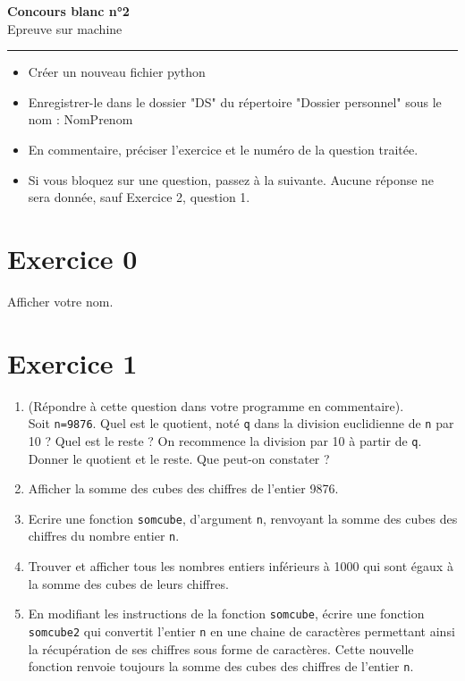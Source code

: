 \documentclass[a4paper,10pt]{article}
\begin{document}

\begin{center}
\Large \textbf{Concours blanc n°2} \\
Epreuve sur machine \\
\rule{16.5cm}{0.05cm}
\end{center}

\begin{boxedminipage}{\textwidth} 
\begin{itemize}
\item Créer un nouveau fichier python
\item Enregistrer-le dans le dossier "DS" du répertoire "Dossier personnel" sous le nom : NomPrenom
\item En commentaire, préciser l'exercice et le numéro de la question traitée.
\item Si vous bloquez sur une question, passez à la suivante. Aucune réponse ne sera donnée, sauf Exercice 2, question 1.
\end{itemize}
\end{boxedminipage}

\section*{Exercice 0}
Afficher votre nom.

\section*{Exercice 1}
\begin{enumerate}
\item (Répondre à cette question dans votre programme en commentaire).\\ 
Soit \verb?n=9876?. Quel est le quotient, noté \verb?q? dans la division euclidienne de \verb?n? par 10 ? Quel est le reste ? On recommence la division par 10 à partir de \verb?q?. Donner le quotient et le reste. Que peut-on constater ?
\item Afficher la somme des cubes des chiffres de l'entier 9876.
\item Ecrire une fonction \verb?somcube?, d'argument \verb?n?, renvoyant la somme des cubes des chiffres du nombre entier \verb?n?.
\item Trouver et afficher tous les nombres entiers inférieurs à 1000 qui sont égaux à la somme des cubes de leurs chiffres.
\item En modifiant les instructions de la fonction \verb?somcube?, écrire une fonction \verb?somcube2? qui convertit l'entier \verb?n? en une chaine de caractères permettant ainsi la récupération de ses chiffres sous forme de caractères. Cette nouvelle fonction renvoie toujours la somme des cubes des chiffres de l'entier \verb?n?.
\end{enumerate}
\end{document}
